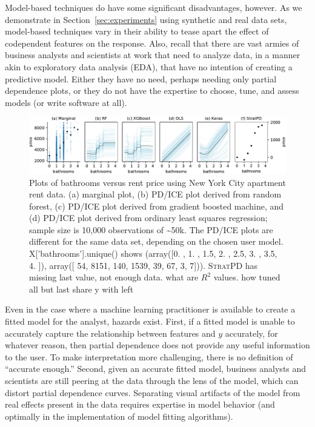 \documentclass{article}
\newcommand{\secref}[1]{Section~\ref{#1}}
\newcommand{\spd}{\fontfamily{cmr}\textsc{\small StratPD}}
\begin{document}
Model-based techniques do have some significant disadvantages, however.   As we demonstrate in \secref{sec:experiments} using synthetic and real data sets, model-based techniques vary in their ability to tease apart the effect of codependent features on the response.  Also, recall that there are vast armies of business analysts and scientists at work that need to analyze data, in a manner akin to exploratory data analysis (EDA), that have no intention of creating a predictive model.  Either they have no need, perhaps needing only partial dependence plots, or they do not have the expertise to choose, tune, and assess models (or write software at all). 

\begin{figure}
\begin{center}
\includegraphics[scale=0.61]{images/bathrooms_vs_price.pdf}
\caption{\small Plots of bathrooms versus rent price using New York City apartment rent data. (a) marginal plot, (b) PD/ICE plot derived from random forest, (c) PD/ICE plot derived from gradient boosted machine, and (d) PD/ICE plot derived from ordinary least squares regression; sample size is 10,000 observations of \textasciitilde50k. The PD/ICE plots are  different for the same data set, depending on the chosen user model. X['bathrooms'].unique() shows (array([0. , 1. , 1.5, 2. , 2.5, 3. , 3.5, 4. ]),
 array([  54, 8151,  140, 1539,   39,   67,    3,    7])). \spd{} has missing last value, not enough data. what are $R^2$ values. how tuned all but last share y with left \vspace{-7mm}}
\label{fig:baths_price}
\end{center}
\end{figure}

Even in the case where a machine learning practitioner is available to create a fitted model for the analyst, hazards exist. First, if a fitted model is unable to accurately capture the relationship between features and $y$ accurately, for whatever reason, then partial dependence does not provide any useful information to the user.  To make interpretation more challenging, there is no definition of ``accurate enough.'' Second, given an accurate fitted model, business analysts and scientists are still peering at the data through the lens of the model, which can distort partial dependence curves. Separating visual artifacts of the model from real effects present in the data requires expertise in model behavior (and optimally in the implementation of model fitting algorithms). 
\end{document}
